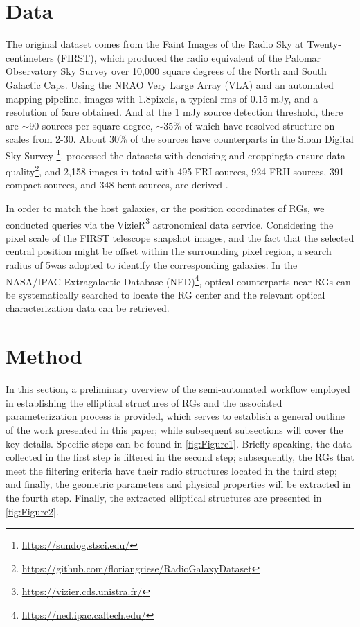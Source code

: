 \documentclass{aa}
\begin{document}
\section{Data}\label{sec:Data}
The original dataset comes from the Faint Images of the Radio Sky at Twenty-centimeters (FIRST), 
which produced the radio equivalent of the Palomar Observatory Sky Survey over 10,000 square degrees of the North and South Galactic Caps. 
Using the NRAO Very Large Array (VLA) and an automated mapping pipeline, images with 1.8\arcsec pixels, a typical rms of 0.15 mJy, and a resolution of 5\arcsec are obtained. 
And at the 1 mJy source detection threshold, there are $\sim$90 sources per square degree, $\sim$35\% of which have resolved structure on scales from 2-30\arcsec. About 30\% of the sources have counterparts in the Sloan Digital Sky Survey \footnote{\url{https://sundog.stsci.edu/}}. 
\cite{griese_first_2023} processed the datasets with denoising and cropping\textemdash to ensure data quality\footnote{\url{https://github.com/floriangriese/RadioGalaxyDataset}},
and 2,158 images in total with 495 FRI sources, 924 FRII sources, 391 compact sources, and 348 bent sources, are derived \citep{griese_floriangrieseradiogalaxydataset_2022}. 

In order to match the host galaxies, or the position coordinates of RGs, we conducted queries via the VizieR\footnote{\url{https://vizier.cds.unistra.fr/}} astronomical data service. Considering the pixel scale of the FIRST telescope snapshot images, and the fact that the selected central position might be offset within the surrounding pixel region, a search radius of 5\arcsec was adopted to identify the corresponding galaxies. In the NASA/IPAC Extragalactic Database (NED)\footnote{\url{https://ned.ipac.caltech.edu/}}, optical counterparts near RGs can be systematically searched to locate the RG center and the relevant optical characterization data can be retrieved. 

\label{sec:Data}



\section{Method}\label{sec:Method}

In this section, a preliminary overview of the semi-automated workflow employed in establishing the elliptical structures of RGs and the associated parameterization process is provided, which serves to establish a general outline of the work presented in this paper; while subsequent subsections will cover the key details. Specific steps can be found in \autoref{fig:Figure1}. Briefly speaking, the data collected in the first step is filtered in the second step; subsequently, the RGs that meet the filtering criteria have their radio structures located in the third step; and finally, the geometric parameters and physical properties will be extracted in the fourth step. Finally, the extracted elliptical structures are presented in \autoref{fig:Figure2}.
\end{document}
